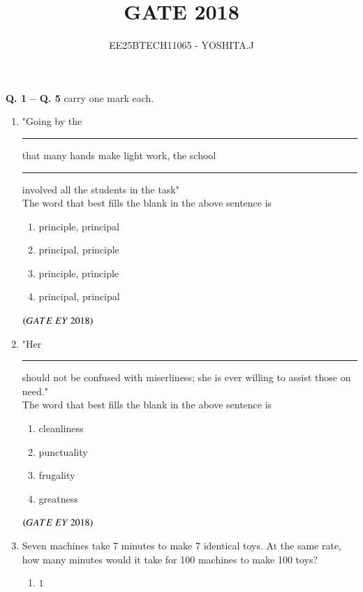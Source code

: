 \documentclass[journal]{IEEEtran}
\numberwithin{equation}{enumi}
\numberwithin{figure}{enumi}
\begin{document}

\vspace{3cm}

\title{GATE 2018}
\author{EE25BTECH11065 - YOSHITA.J}
\maketitle

\noindent \textbf{Q. 1 -- Q. \textbf{5}} carry one mark each.

\begin{enumerate}
    \item "Going by the\rule{3cm}{0.15mm} that many hands make light work, the school\rule{3cm}{0.15mm} involved all the students in the task"\\The word that best fills the blank in the above sentence is
    \begin{multicols}{2}
    \begin{enumerate}
        \item  principle, principal
        \item  principal, principle\\
        \item  principle, principle
        \item  principal, principal
    \end{enumerate}
    \end{multicols}
    \hfill{$\brak{ GATE\ EY\ 2018}$}
    \bigskip
    \item "Her\rule{3cm}{0.15mm} should not be confused with miserliness; she is ever willing to assist those on need."\\The word that best fills the blank in the above sentence is
\begin{multicols}{4}
\begin{enumerate}
    \item cleanliness
    \item punctuality
    \item frugality
    \item greatness
\end{enumerate}
\end{multicols}
\hfill{$\brak{ GATE\ EY\ 2018}$}
\bigskip
\item Seven machines take 7 minutes to make 7 identical toys. At the same rate, how many minutes would it take for 100 machines to make 100 toys?
\begin{multicols}{4}
\begin{enumerate}
    \item $1$

\end{enumerate}
\end{multicols}
\end{enumerate}
\end{document}
